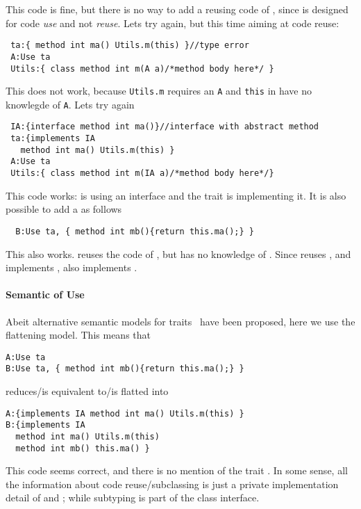 This code is fine, but there is no way to add a \Q@B@ reusing code of \Q@A@, since
\Q@A@ is designed for code \emph{use} and not \emph{reuse}. Lets try
again, but this time aiming at code reuse:

\begin{lstlisting}
 ta:{ method int ma() Utils.m(this) }//type error
 A:Use ta
 Utils:{ class method int m(A a)/*method body here*/ }
\end{lstlisting}

This does not work, because \lstinline{Utils.m} requires an \lstinline{A} and \lstinline{this} in
\Q@ta@ have no knowlegde of \lstinline{A}. Lets try again

\begin{lstlisting}
 IA:{interface method int ma()}//interface with abstract method
 ta:{implements IA
   method int ma() Utils.m(this) }
 A:Use ta
 Utils:{ class method int m(IA a)/*method body here*/}
\end{lstlisting}

This code works: \Q@Utils@ is using an interface \Q@IA@ and the trait \Q@ta@
is implementing it. It is also possible to add a \Q@B@ as follows
\begin{lstlisting}
  B:Use ta, { method int mb(){return this.ma();} }
\end{lstlisting}
This also works.  \Q@B@ reuses the code of \Q@ta@, but has no knowledge of \Q@A@.
Since \Q@B@ reuses \Q@ta@, and \Q@ta@ implements \Q@IA@, also \Q@B@ implements \Q@IA@. 

\paragraph*{Semantic of Use}
Abeit alternative semantic models for traits~\cite{} have been proposed,
here we use the flattening model.
This means that 
\begin{lstlisting}
A:Use ta
B:Use ta, { method int mb(){return this.ma();} }
\end{lstlisting}
 
  reduces/is equivalent to/is flatted into
  
 \begin{lstlisting}
A:{implements IA method int ma() Utils.m(this) }
B:{implements IA
  method int ma() Utils.m(this)
  method int mb() this.ma() } 

 \end{lstlisting}
 
This code seems correct, and there is no mention of the trait \Q@ta@. In some sense, all the information about code reuse/subclassing is just a private implementation detail of \Q@A@ and \Q@B@; while subtyping is part of the class interface.

